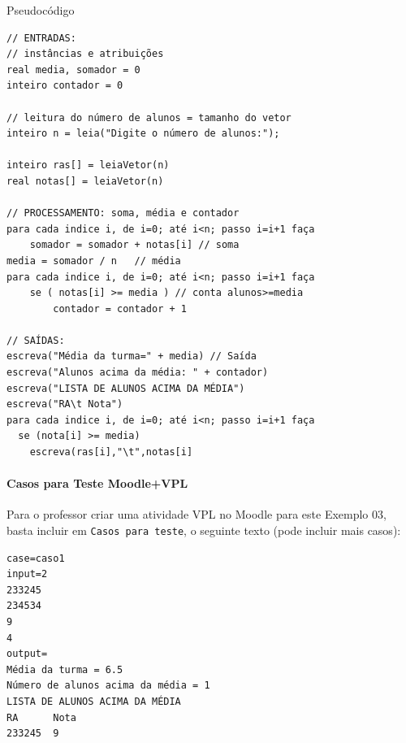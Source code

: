 \documentclass[12pt,a4paper]{article}
\begin{document}
    Pseudocódigo

\begin{verbatim}
// ENTRADAS:
// instâncias e atribuições
real media, somador = 0
inteiro contador = 0

// leitura do número de alunos = tamanho do vetor
inteiro n = leia("Digite o número de alunos:");

inteiro ras[] = leiaVetor(n)
real notas[] = leiaVetor(n)

// PROCESSAMENTO: soma, média e contador
para cada indice i, de i=0; até i<n; passo i=i+1 faça 
    somador = somador + notas[i] // soma
media = somador / n   // média
para cada indice i, de i=0; até i<n; passo i=i+1 faça    
    se ( notas[i] >= media ) // conta alunos>=media
        contador = contador + 1

// SAÍDAS:
escreva("Média da turma=" + media) // Saída
escreva("Alunos acima da média: " + contador)
escreva("LISTA DE ALUNOS ACIMA DA MÉDIA")
escreva("RA\t Nota")
para cada indice i, de i=0; até i<n; passo i=i+1 faça 
  se (nota[i] >= media)
    escreva(ras[i],"\t",notas[i]
\end{verbatim}

    \hypertarget{casos-para-teste-moodlevpl}{%
\paragraph{Casos para Teste
Moodle+VPL}\label{casos-para-teste-moodlevpl}}

Para o professor criar uma atividade VPL no Moodle para este Exemplo 03,
basta incluir em \texttt{Casos\ para\ teste}, o seguinte texto (pode
incluir mais casos):

\begin{verbatim}
case=caso1
input=2
233245
234534
9
4
output= 
Média da turma = 6.5
Número de alunos acima da média = 1
LISTA DE ALUNOS ACIMA DA MÉDIA
RA      Nota
233245  9
\end{verbatim}
\end{document}
